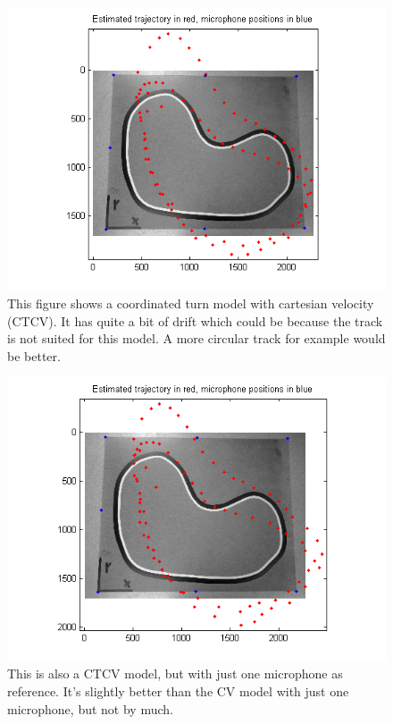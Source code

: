 \documentclass[11pt]{article}
\begin{document}
\begin{figure}
\begin{center}
  \includegraphics[width=\textwidth]{ekf_CTCV_TDOA.png}
  \caption{This figure shows a coordinated turn model with cartesian velocity (CTCV). It has quite a bit of drift which could be because the track is not suited for this model. A more circular track for example would be better.}
  \end{center}
\end{figure}
\begin{figure}
\begin{center}
  \includegraphics[width=\textwidth]{ekf_CTCV_TDOA_one_reference.png}
  \caption{This is also a CTCV model, but with just one microphone as reference. It's slightly better than the CV model with just one microphone, but not by much.}
  \end{center}
\end{figure}
\end{document}
